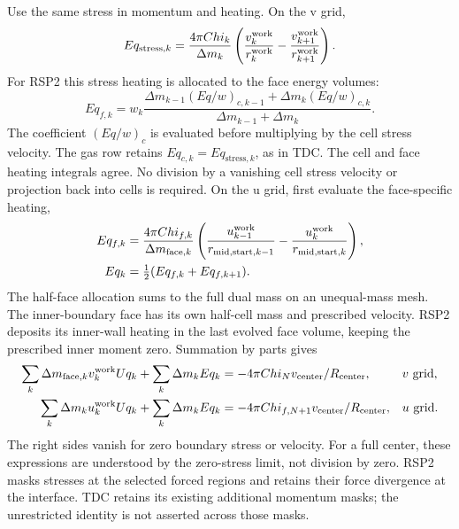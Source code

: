 \documentclass[11pt]{article}
\begin{document}
Use the same stress in momentum and heating. On the v grid,
\begin{equation}
 Eq_{\mathrm{stress},k}=\frac{4\pi Chi_k}{\Delta m_k}
 \left(\frac{v_k^{\rm work}}{r_k^{\rm work}}
       -\frac{v_{k+1}^{\rm work}}{r_{k+1}^{\rm work}}\right).
\end{equation}
For RSP2 this stress heating is allocated to the face energy volumes:
\begin{equation}
 Eq_{f,k}=w_k\frac{\Delta m_{k-1}(Eq/w)_{c,k-1}+\Delta m_k(Eq/w)_{c,k}}
 {\Delta m_{k-1}+\Delta m_k}.
\end{equation}
The coefficient $(Eq/w)_c$ is evaluated before multiplying by the cell
stress velocity. The gas row retains $Eq_{c,k}=Eq_{\mathrm{stress},k}$,
as in TDC. The cell and face heating integrals agree. No division by a
vanishing cell stress velocity or projection back into cells is required.
On the u grid, first evaluate the face-specific heating,
\begin{align}
 Eq_{f,k}&=\frac{4\pi Chi_{f,k}}{\Delta m_{\mathrm{face},k}}
 \left(\frac{u_{k-1}^{\rm work}}{r_{\mathrm{mid,start},k-1}}
       -\frac{u_k^{\rm work}}{r_{\mathrm{mid,start},k}}\right),\\
 Eq_k&=\tfrac12(Eq_{f,k}+Eq_{f,k+1}).
\end{align}
The half-face allocation sums to the full dual mass on an unequal-mass mesh.
The inner-boundary face has its own half-cell mass and prescribed velocity.
RSP2 deposits its inner-wall heating in the last evolved face volume,
keeping the prescribed inner moment zero.
Summation by parts gives
\begin{align}
 \sum_k\Delta m_{\mathrm{face},k}v_k^{\rm work}Uq_k
  +\sum_k\Delta m_k Eq_k
  &=-4\pi Chi_N v_{\rm center}/R_{\rm center},&&v\text{ grid},\\
 \sum_k\Delta m_k u_k^{\rm work}Uq_k
  +\sum_k\Delta m_k Eq_k
  &=-4\pi Chi_{f,N+1}v_{\rm center}/R_{\rm center},&&u\text{ grid}.
\end{align}
The right sides vanish for zero boundary stress or velocity. For a full center,
these expressions are understood by the zero-stress limit, not division by zero.
RSP2 masks stresses at the selected forced regions and retains their force
divergence at the interface. TDC retains its existing additional momentum
masks; the unrestricted identity is not asserted across those masks.
\end{document}
